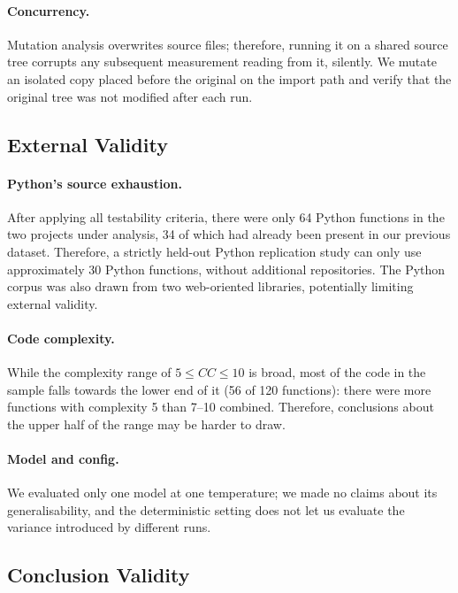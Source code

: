 \paragraph{Concurrency.}
Mutation analysis overwrites source files; therefore, running it on a shared source tree
corrupts any subsequent measurement reading from it, silently. We mutate an isolated copy placed
before the original on the import path and verify that the original tree was not modified after
each run.

\subsection{External Validity}

\paragraph{Python's source exhaustion.}
After applying all testability criteria, there were only 64 Python functions in the two projects
under analysis, 34 of which had already been present in our previous dataset. Therefore, a
strictly held-out Python replication study can only use approximately 30 Python functions,
without additional repositories. The Python corpus was also drawn from two web-oriented
libraries, potentially limiting external validity.

\paragraph{Code complexity.}
While the complexity range of $5 \le CC \le 10$ is broad, most of the code in the sample falls
towards the lower end of it (56 of 120 functions): there were more functions with complexity 5
than 7--10 combined. Therefore, conclusions about the upper half of the range may be harder to
draw.

\paragraph{Model and config.}
We evaluated only one model at one temperature; we made no claims about its generalisability, and
the deterministic setting does not let us evaluate the variance introduced by different runs.

\subsection{Conclusion Validity}


